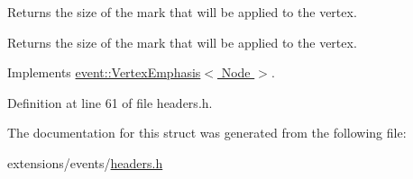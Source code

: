 Returns the size of the mark that will be applied to the vertex. 

\begin{DoxyReturn}{Returns}
the size of the mark that will be applied to the vertex. 
\end{DoxyReturn}


Implements \hyperlink{structevent_1_1VertexEmphasis_a2213738af67f360ce354f237052ed4fb}{event\+::\+Vertex\+Emphasis$<$ Node $>$}.



Definition at line 61 of file headers.\+h.



The documentation for this struct was generated from the following file\+:\begin{DoxyCompactItemize}
\item 
extensions/events/\hyperlink{extensions_2events_2headers_8h}{headers.\+h}\end{DoxyCompactItemize}
